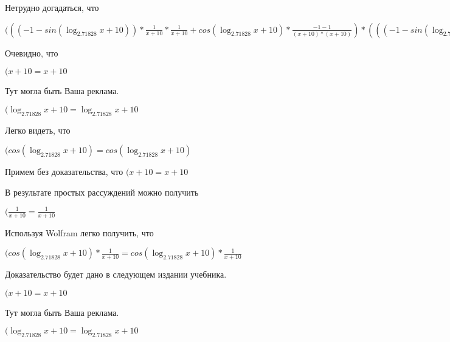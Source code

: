 \documentclass[12pt,a4paper,fleqn]{article}
\theoremstyle{definition}
\begin{document}
Нетрудно догадаться, что

$((( -1  - sin(\log_{ 2.71828 }{ x  +  10 })) * \frac{ 1 }{ x  +  10 }
 * \frac{ 1 }{ x  +  10 }
 + cos(\log_{ 2.71828 }{ x  +  10 }) * \frac{ -1  -  1 }{( x  +  10 ) * ( x  +  10 )}
) * ((( -1  - sin(\log_{ 2.71828 }{ x  +  10 })) * \frac{ 1 }{ x  +  10 }
 * \frac{ 1 }{ x  +  10 }
 + cos(\log_{ 2.71828 }{ x  +  10 }) * \frac{ -2 }{( x  +  10 ) * ( x  +  10 )}
) * { 3 }^{sin(\log_{ 2.71828 }{ x  +  10 })} + cos(\log_{ 2.71828 }{ x  +  10 }) * \frac{ 1 }{ x  +  10 }
 * cos(\log_{ 2.71828 }{ x  +  10 }) * \frac{ 1 }{ x  +  10 }
 * { 3 }^{sin(\log_{ 2.71828 }{ x  +  10 })}) = (( -1  - sin(\log_{ 2.71828 }{ x  +  10 })) * \frac{ 1 }{ x  +  10 }
 * \frac{ 1 }{ x  +  10 }
 + cos(\log_{ 2.71828 }{ x  +  10 }) * \frac{ -1  -  1 }{( x  +  10 ) * ( x  +  10 )}
) * ((( -1  - sin(\log_{ 2.71828 }{ x  +  10 })) * \frac{ 1 }{ x  +  10 }
 * \frac{ 1 }{ x  +  10 }
 + cos(\log_{ 2.71828 }{ x  +  10 }) * \frac{ -2 }{( x  +  10 ) * ( x  +  10 )}
) * { 3 }^{sin(\log_{ 2.71828 }{ x  +  10 })} + cos(\log_{ 2.71828 }{ x  +  10 }) * \frac{ 1 }{ x  +  10 }
 * cos(\log_{ 2.71828 }{ x  +  10 }) * \frac{ 1 }{ x  +  10 }
 * { 3 }^{sin(\log_{ 2.71828 }{ x  +  10 })})$

Очевидно, что

$( x  +  10  =  x  +  10 $

Тут могла быть Ваша реклама.

$(\log_{ 2.71828 }{ x  +  10 } = \log_{ 2.71828 }{ x  +  10 }$

Легко видеть, что

$(cos(\log_{ 2.71828 }{ x  +  10 }) = cos(\log_{ 2.71828 }{ x  +  10 })$

Примем без доказательства, что
$( x  +  10  =  x  +  10 $

В результате простых рассуждений можно получить

$(\frac{ 1 }{ x  +  10 }
 = \frac{ 1 }{ x  +  10 }
$

Используя Wolfram легко получить, что

$(cos(\log_{ 2.71828 }{ x  +  10 }) * \frac{ 1 }{ x  +  10 }
 = cos(\log_{ 2.71828 }{ x  +  10 }) * \frac{ 1 }{ x  +  10 }
$

Доказательство будет дано в следующем издании учебника.

$( x  +  10  =  x  +  10 $

Тут могла быть Ваша реклама.

$(\log_{ 2.71828 }{ x  +  10 } = \log_{ 2.71828 }{ x  +  10 }$
\end{document}

